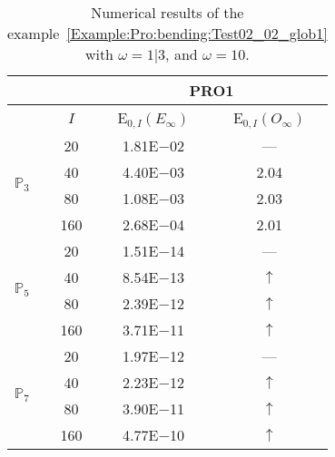 \begin{table}[H]
\caption{Numerical results of the example~\ref{Example:Pro:bending:Test02_02_glob1} with $\omega=1|3$, and $\omega=10$.}
\setlength{\tabcolsep}{5pt}
\centering
\begin{tabular}{@{}l c c c@{}}
\toprule
 &  & \multicolumn{2}{c}{PRO1}\\
\midrule
 & $I$ & E$_{0,I}(E_{\infty})$ & E$_{0,I}(O_{\infty})$\\
\midrule
\multirow{4}{*}{$\mathbb{P}_{3}$} & 20 & 1.81E$-$02 & ---\\
 & 40 & 4.40E$-$03 & 2.04\\
 & 80 & 1.08E$-$03 & 2.03\\
 & 160 & 2.68E$-$04 & 2.01\\
\midrule
\multirow{4}{*}{$\mathbb{P}_{5}$} & 20 & 1.51E$-$14 & ---\\
 & 40 & 8.54E$-$13 & $\uparrow$\\
 & 80 & 2.39E$-$12 & $\uparrow$\\
 & 160 & 3.71E$-$11 & $\uparrow$\\
\midrule
\multirow{4}{*}{$\mathbb{P}_{7}$} & 20 & 1.97E$-$12 & ---\\
 & 40 & 2.23E$-$12 & $\uparrow$\\
 & 80 & 3.90E$-$11 & $\uparrow$\\
 & 160 & 4.77E$-$10 & $\uparrow$\\
\bottomrule
\end{tabular}
\label{Table:PRO:test_02_02_test12}
\end{table}
